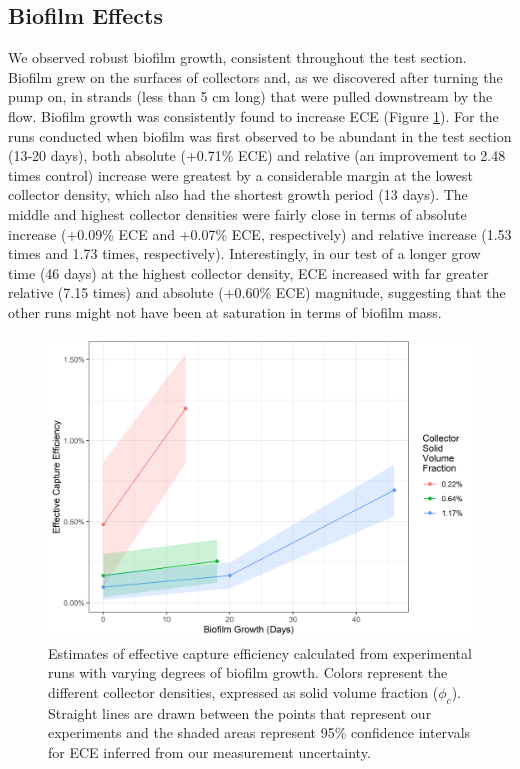 \documentclass[geosciences,article,submit,moreauthors,pdftex]{Definitions/mdpi}
\begin{document}
\subsection{Biofilm Effects}

We observed robust biofilm growth, consistent throughout the test section. Biofilm grew on the surfaces of collectors and, as we discovered after turning the pump on, in strands (less than 5 cm long) that were pulled downstream by the flow. Biofilm growth was consistently found to increase ECE (Figure \ref{fig:biofilm}). For the runs conducted when biofilm was first observed to be abundant in the test section (13-20 days), both absolute (+0.71\% ECE) and relative (an improvement to 2.48 times control) increase were greatest by a considerable margin at the lowest collector density, which also had the shortest growth period (13 days). The middle and highest collector densities were fairly close in terms of absolute increase (+0.09\% ECE and +0.07\% ECE, respectively) and relative increase (1.53 times and 1.73 times, respectively). Interestingly, in our test of a longer grow time (46 days) at the highest collector density, ECE increased with far greater relative (7.15 times) and absolute (+0.60\% ECE) magnitude, suggesting that the other runs might not have been at saturation in terms of biofilm mass.

\begin{figure}[H]
\centering
\includegraphics[width=5in]{../pics/biofilm.png}
\caption{Estimates of effective capture efficiency calculated from experimental runs with varying degrees of biofilm growth. Colors represent the different collector densities, expressed as solid volume fraction ($\phi_c$). Straight lines are drawn between the points that represent our experiments and the shaded areas represent 95\% confidence intervals for ECE inferred from our measurement uncertainty.}
\label{fig:biofilm}
\end{figure}   
\end{document}
